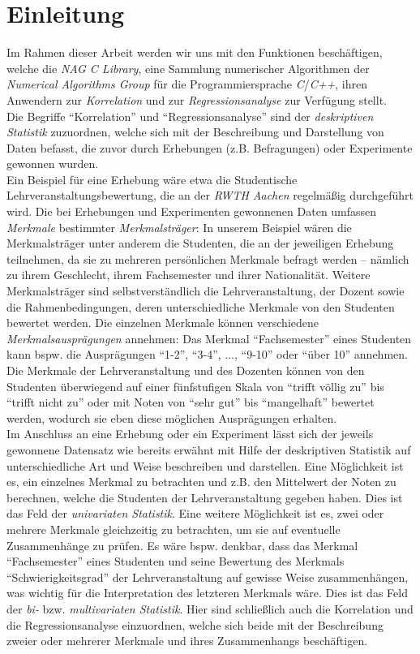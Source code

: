 \documentclass{article}
\begin{document}
\section{Einleitung}
Im Rahmen dieser Arbeit werden wir uns mit den Funktionen beschäftigen, welche die {\it NAG C Library}, eine Sammlung numerischer Algorithmen der {\it Numerical Algorithms Group} für die Programmiersprache {\it C}/{\it C++}, ihren Anwendern zur {\it Korrelation} und zur {\it Regressionsanalyse} zur Verfügung stellt.\\
Die Begriffe "`Korrelation"' und "`Regressionsanalyse"' sind der {\it deskriptiven Statistik} zuzuordnen, welche sich mit der Beschreibung und Darstellung von Daten befasst, die zuvor durch Erhebungen (z.B. Befragungen) oder Experimente gewonnen wurden.\\
Ein Beispiel für eine Erhebung wäre etwa die Studentische Lehrveranstaltungsbewertung, die an der {\it RWTH Aachen} regelmäßig durchgeführt wird. Die bei Erhebungen und Experimenten gewonnenen Daten umfassen {\it Merkmale} bestimmter {\it Merkmalsträger}: In unserem Beispiel wären die Merkmalsträger unter anderem die Studenten, die an der jeweiligen Erhebung teilnehmen, da sie zu mehreren persönlichen Merkmale befragt werden -- nämlich zu ihrem Geschlecht, ihrem Fachsemester und ihrer Nationalität. Weitere Merkmalsträger sind selbstverständlich die Lehrveranstaltung, der Dozent sowie die Rahmenbedingungen, deren unterschiedliche Merkmale von den Studenten bewertet werden. Die einzelnen Merkmale können verschiedene {\it Merkmalsausprägungen} annehmen: Das Merkmal "`Fachsemester"' eines Studenten kann bspw. die Ausprägungen "`1-2"', "`3-4"', ..., "`9-10"' oder "`über 10"' annehmen. Die Merkmale der Lehrveranstaltung und des Dozenten können von den Studenten überwiegend auf einer fünfstufigen Skala von "`trifft völlig zu"' bis "`trifft nicht zu"' oder mit Noten von "`sehr gut"' bis "`mangelhaft"' bewertet werden, wodurch sie eben diese möglichen Ausprägungen erhalten.\\
Im Anschluss an eine Erhebung oder ein Experiment lässt sich  der jeweils gewonnene Datensatz wie bereits erwähnt mit Hilfe der deskriptiven Statistik auf unterschiedliche Art und Weise beschreiben und darstellen. Eine Möglichkeit ist es, ein einzelnes Merkmal zu betrachten und z.B. den Mittelwert der Noten zu berechnen, welche die Studenten der Lehrveranstaltung gegeben haben. Dies ist das Feld der {\it univariaten Statistik}. Eine weitere Möglichkeit ist es, zwei oder mehrere Merkmale gleichzeitig zu betrachten, um sie auf eventuelle Zusammenhänge zu prüfen. Es wäre bspw. denkbar, dass das Merkmal "`Fachsemester"' eines Studenten und seine Bewertung des Merkmals "`Schwierigkeitsgrad"' der Lehrveranstaltung auf gewisse Weise zusammenhängen, was wichtig für die Interpretation des letzteren Merkmals wäre. Dies ist das Feld der {\it bi-} bzw. {\it multivariaten Statistik}. Hier sind schließlich auch die Korrelation und die Regressionsanalyse einzuordnen, welche sich beide mit der Beschreibung zweier oder mehrerer Merkmale und ihres Zusammenhangs beschäftigen.
\end{document}
